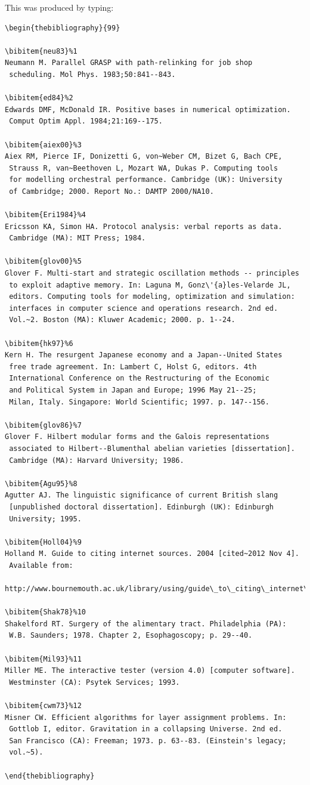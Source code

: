 \documentclass{gCOV2e}
\theoremstyle{plain}%
\theoremstyle{definition}
\theoremstyle{remark}
\begin{document}
\bigskip
\noindent This was produced by typing:
\begin{verbatim}
\begin{thebibliography}{99}

\bibitem{neu83}%1
Neumann M. Parallel GRASP with path-relinking for job shop
 scheduling. Mol Phys. 1983;50:841--843.

\bibitem{ed84}%2
Edwards DMF, McDonald IR. Positive bases in numerical optimization.
 Comput Optim Appl. 1984;21:169--175.

\bibitem{aiex00}%3
Aiex RM, Pierce IF, Donizetti G, von~Weber CM, Bizet G, Bach CPE,
 Strauss R, van~Beethoven L, Mozart WA, Dukas P. Computing tools
 for modelling orchestral performance. Cambridge (UK): University
 of Cambridge; 2000. Report No.: DAMTP 2000/NA10.

\bibitem{Eri1984}%4
Ericsson KA, Simon HA. Protocol analysis: verbal reports as data.
 Cambridge (MA): MIT Press; 1984.

\bibitem{glov00}%5
Glover F. Multi-start and strategic oscillation methods -- principles
 to exploit adaptive memory. In: Laguna M, Gonz\'{a}les-Velarde JL,
 editors. Computing tools for modeling, optimization and simulation:
 interfaces in computer science and operations research. 2nd ed.
 Vol.~2. Boston (MA): Kluwer Academic; 2000. p. 1--24.

\bibitem{hk97}%6
Kern H. The resurgent Japanese economy and a Japan--United States
 free trade agreement. In: Lambert C, Holst G, editors. 4th
 International Conference on the Restructuring of the Economic
 and Political System in Japan and Europe; 1996 May 21--25;
 Milan, Italy. Singapore: World Scientific; 1997. p. 147--156.

\bibitem{glov86}%7
Glover F. Hilbert modular forms and the Galois representations
 associated to Hilbert--Blumenthal abelian varieties [dissertation].
 Cambridge (MA): Harvard University; 1986.

\bibitem{Agu95}%8
Agutter AJ. The linguistic significance of current British slang
 [unpublished doctoral dissertation]. Edinburgh (UK): Edinburgh
 University; 1995.

\bibitem{Holl04}%9
Holland M. Guide to citing internet sources. 2004 [cited~2012 Nov 4].
 Available from:
 http://www.bournemouth.ac.uk/library/using/guide\_to\_citing\_internet\_sourc.html.

\bibitem{Shak78}%10
Shakelford RT. Surgery of the alimentary tract. Philadelphia (PA):
 W.B. Saunders; 1978. Chapter 2, Esophagoscopy; p. 29--40.

\bibitem{Mil93}%11
Miller ME. The interactive tester (version 4.0) [computer software].
 Westminster (CA): Psytek Services; 1993.

\bibitem{cwm73}%12
Misner CW. Efficient algorithms for layer assignment problems. In:
 Gottlob I, editor. Gravitation in a collapsing Universe. 2nd ed.
 San Francisco (CA): Freeman; 1973. p. 63--83. (Einstein's legacy;
 vol.~5).

\end{thebibliography}
\end{verbatim}
\end{document}
